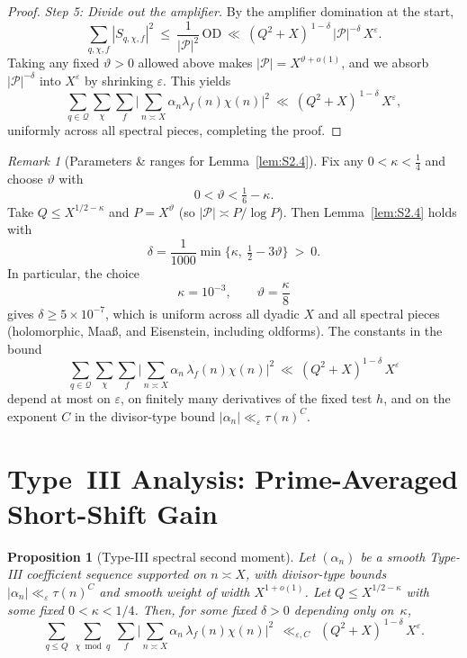\documentclass[11pt]{article}
\newtheorem{proposition}[lemma]{Proposition}
\theoremstyle{definition}
\theoremstyle{remark}
\newtheorem{remark}[lemma]{Remark}
\numberwithin{equation}{part}
\begin{document}
\begin{proof}
	\emph{Step 5: Divide out the amplifier.}
	By the amplifier domination at the start,
	\[
		\sum_{q,\chi,f} |S_{q,\chi,f}|^2 \ \le\ \frac{1}{|\mathcal P|^2}\,\mathrm{OD}
		\ \ll\ (Q^2+X)^{\,1-\delta}\,|\mathcal P|^{-\delta}\,X^\varepsilon.
	\]
	Taking any fixed $\vartheta>0$ allowed above makes $|\mathcal P|=X^{\vartheta+o(1)}$, and we absorb $|\mathcal P|^{-\delta}$ into $X^\varepsilon$ by shrinking $\varepsilon$. This yields
	\[
		\sum_{q\in\mathcal Q}\sum_{\chi}\sum_f \Big|\sum_{n\asymp X}\alpha_n\lambda_f(n)\chi(n)\Big|^2
		\ \ll\ (Q^2+X)^{\,1-\delta}\,X^\varepsilon,
	\]
	uniformly across all spectral pieces, completing the proof.
\end{proof}

\begin{remark}[Parameters \& ranges for Lemma~\ref{lem:S2.4}]
	Fix any $0<\kappa<\tfrac14$ and choose $\vartheta$ with
	\[
		0<\vartheta<\tfrac16-\kappa .
	\]
	Take $Q\le X^{1/2-\kappa}$ and $P=X^\vartheta$ (so $|\mathcal P|\asymp P/\log P$).
	Then Lemma~\ref{lem:S2.4} holds with
	\[
		\delta=\frac{1}{1000}\min\!\Big\{\kappa,\ \tfrac12-3\vartheta\Big\}\ >\ 0 .
	\]
	In particular, the choice
	\[
		\kappa=10^{-3},\qquad \vartheta=\frac{\kappa}{8}
	\]
	gives $\delta\ge 5\times 10^{-7}$, which is uniform across all dyadic $X$ and all spectral pieces (holomorphic, Maa\ss, and Eisenstein, including oldforms). The constants in the bound
	\[
		\sum_{q\in\mathcal Q}\sum_{\chi}\sum_f \Big|\sum_{n\asymp X}\alpha_n\,\lambda_f(n)\chi(n)\Big|^2
		\ \ll\ (Q^2+X)^{1-\delta}\,X^\varepsilon
	\]
	depend at most on $\varepsilon$, on finitely many derivatives of the fixed test $h$, and on the exponent $C$ in the divisor-type bound $|\alpha_n|\ll_\varepsilon \tau(n)^C$.
\end{remark}

\section{Type~III Analysis: Prime-Averaged Short-Shift Gain}

\begin{proposition}[Type-III spectral second moment]\label{prop:typeIII}
	Let $(\alpha_n)$ be a smooth Type-III coefficient sequence supported on $n\asymp X$, with divisor-type bounds $|\alpha_n|\ll_\varepsilon \tau(n)^C$ and smooth weight of width $X^{1+o(1)}$.
	Let $Q\le X^{1/2-\kappa}$ with some fixed $0<\kappa<1/4$. Then, for some fixed $\delta>0$ depending only on~$\kappa$,
	\[
		\sum_{q\le Q}\ \sum_{\chi\bmod q}\ \sum_{f}
		\Bigg|\sum_{n\asymp X}\alpha_n\,\lambda_f(n)\chi(n)\Bigg|^2
		\ \ \ll_{\varepsilon,C}\ \ (Q^2+X)^{\,1-\delta}\,X^{\varepsilon}.
	\]
\end{proposition}
\end{document}
